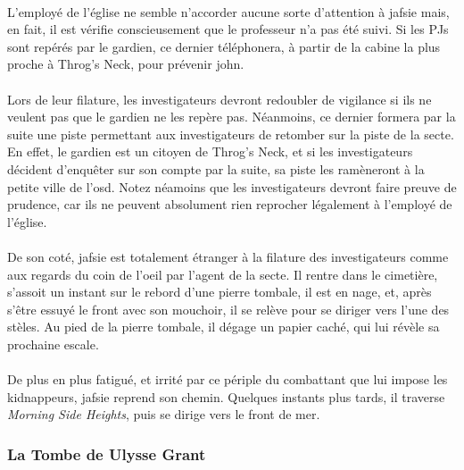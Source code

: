 \paragraph{} L'employé de l'église ne semble n'accorder aucune sorte d'attention à \gls{jafsie} mais, en fait, il est vérifie conscieusement 
que le professeur n'a pas été suivi. Si les PJs sont repérés par le gardien, ce dernier téléphonera, à partir de la cabine la plus proche à 
Throg's Neck, pour prévenir \gls{john}.


\paragraph{} Lors de leur filature, les investigateurs devront redoubler de vigilance si ils ne veulent pas que le gardien ne les repère
pas. Néanmoins, ce dernier formera par la suite une piste permettant aux investigateurs de retomber sur la piste de la secte. En effet, le
gardien est un citoyen de Throg's Neck, et si les investigateurs décident d'enquêter sur son compte par la suite, sa piste les ramèneront
à la petite ville de l'\gls{osd}. Notez néamoins que les investigateurs devront faire preuve de prudence, car ils ne peuvent absolument
rien reprocher légalement à l'employé de l'église.

\paragraph{} De son coté, \gls{jafsie} est totalement étranger à la filature des investigateurs comme aux regards du coin de l'oeil par 
l'agent de la secte. Il rentre dans le cimetière, s'assoit un instant sur le rebord d'une pierre tombale, il est en nage, et, après s'être
essuyé le front avec son mouchoir, il se relève pour se diriger vers l'une des stèles. Au pied de la pierre tombale, il dégage un papier
caché, qui lui révèle sa prochaine escale.

\paragraph{} De plus en plus fatigué, et irrité par ce périple du combattant que lui impose les kidnappeurs, \gls{jafsie} reprend son 
chemin. Quelques instants plus tards, il traverse \emph{Morning Side Heights}, puis se dirige vers le front de mer.

\subsubsection{La Tombe de Ulysse Grant} 

